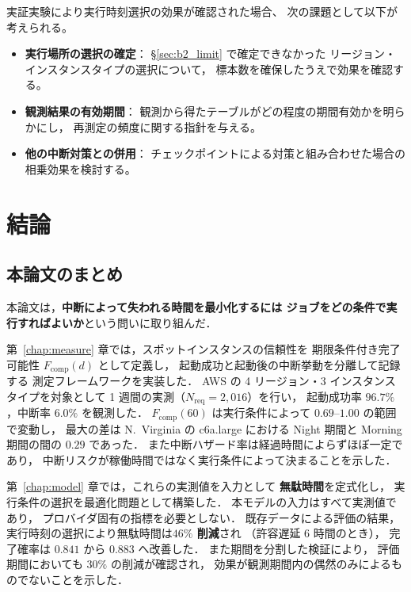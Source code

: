 \documentclass[11pt,a4paper]{ltjsreport}
\newcommand{\Fcomp}{F_{\mathrm{comp}}}
\newcommand{\Nreq}{N_{\mathrm{req}}}
\begin{document}
実証実験により実行時刻選択の効果が確認された場合、
次の課題として以下が考えられる。

\begin{itemize}
  \item \textbf{実行場所の選択の確定}：
        \S\ref{sec:b2_limit} で確定できなかった
        リージョン・インスタンスタイプの選択について，
        標本数を確保したうえで効果を確認する。
  \item \textbf{観測結果の有効期間}：
        観測から得たテーブルがどの程度の期間有効かを明らかにし，
        再測定の頻度に関する指針を与える。
  \item \textbf{他の中断対策との併用}：
        チェックポイントによる対策と組み合わせた場合の
        相乗効果を検討する。
\end{itemize}

\chapter{結論}
\label{chap:conclusion}

\section{本論文のまとめ}

本論文は，\textbf{中断によって失われる時間を最小化するには
ジョブをどの条件で実行すればよいか}という問いに取り組んだ．

第~\ref{chap:measure} 章では，スポットインスタンスの信頼性を
期限条件付き完了可能性 $\Fcomp(d)$ として定義し，
起動成功と起動後の中断挙動を分離して記録する
測定フレームワークを実装した．
AWS の 4 リージョン・3 インスタンスタイプを対象として
1 週間の実測（$\Nreq = 2{,}016$）を行い，
起動成功率 $96.7\%$，中断率 $6.0\%$ を観測した．
$\Fcomp(60)$ は実行条件によって $0.69$--$1.00$ の範囲で変動し，
最大の差は N.~Virginia の c6a.large における
Night 期間と Morning 期間の間の $0.29$ であった．
また中断ハザード率は経過時間によらずほぼ一定であり，
中断リスクが稼働時間ではなく実行条件によって決まることを示した．

第~\ref{chap:model} 章では，これらの実測値を入力として
\textbf{無駄時間}を定式化し，
実行条件の選択を最適化問題として構築した．
本モデルの入力はすべて実測値であり，
プロバイダ固有の指標を必要としない．
既存データによる評価の結果，
実行時刻の選択により無駄時間は\textbf{$46\%$ 削減}され
（許容遅延 6 時間のとき），
完了確率は $0.841$ から $0.883$ へ改善した．
また期間を分割した検証により，
評価期間においても $30\%$ の削減が確認され，
効果が観測期間内の偶然のみによるものでないことを示した．
\end{document}
